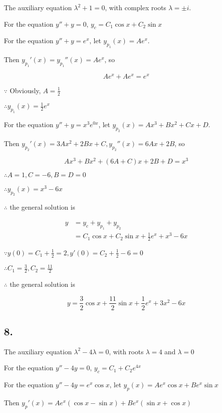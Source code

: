 \documentclass{article}
\begin{document}
  The auxiliary equation $\lambda^2 + 1 = 0$, with complex roots $\lambda = \pm i$.

  For the equation $y'' + y = 0$, $y_c = C_1 \cos x + C_2 \sin x$

  For the equation $y'' + y = e^x$, let $y_{p_1}(x) = Ae^x$.

  Then $y_{p_1}'(x) = y_{p_1}''(x) = Ae^x$, so

  $$Ae^x + Ae^x = e^x$$

  $\because$ Obviously, $A = \frac 1 2$

  $\therefore y_{p_1}(x) = \frac 1 2 e^x$

  For the equation $y'' + y = x^3 e^{0x}$, let $y_{p_2}(x) = Ax^3 + Bx^2 + Cx + D$.

  Then $y_{p_2}'(x) = 3Ax^2 + 2Bx + C, y_{p_2}''(x) = 6Ax + 2B$, so

  $$Ax^3 + Bx^2 + (6A + C)x + 2B + D = x^3$$

  $\therefore A = 1, C = -6, B = D = 0$

  $\therefore y_{p_2}(x) = x^3 - 6x$

  $\therefore$ the general solution is

  $$\begin{aligned}
    y &= y_c + y_{p_1} + y_{p_2} \\
      &= C_1 \cos x + C_2 \sin x + \frac 1 2 e^x + x^3 - 6x
  \end{aligned}$$

  $\because y(0) = C_1 + \frac{1}{2} = 2, y'(0) = C_2 + \frac{1}{2} -6 = 0$

  $\therefore C_1 = \frac{3}{2}, C_2 = \frac{11}{2}$

  $\therefore$ the general solution is

  $$y = \frac{3}{2} \cos x + \frac{11}{2} \sin x + \frac{1}{2}e^x + 3x^2 - 6x$$

  \subsection*{8. }

  The auxiliary equation $\lambda ^2  - 4 \lambda = 0$, with roots $\lambda = 4$ and $\lambda = 0$

  For the equation $y'' - 4y = 0$, $y_c = C_1 + C_2 e^{4x}$

  For the equation $y'' - 4y = e^x \cos x$, let $y_p(x) = Ae^x \cos x + Be^x \sin x$

  Then $y_p'(x) = Ae^x(\cos x - \sin x) + Be^x (\sin x + \cos x)$
\end{document}
